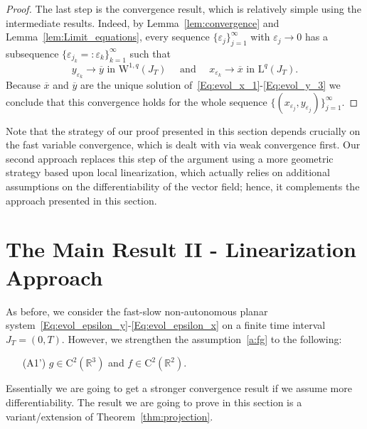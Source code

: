 \documentclass[12pt]{article}
\makeatletter
\newcommand{\mylabel}[2]{#2\def\@currentlabel{#2}\label{#1}}
\def\I{\infty}
\newcommand{\benn}{\begin{equation*}}
\newcommand{\eenn}{\end{equation*}}
\def\I{\infty}
\makeatother
\begin{document}
\begin{proof}
The last step is the convergence result, which is relatively simple using the intermediate
results. Indeed, by Lemma~\ref{lem:convergence} and Lemma~\ref{lem:Limit_equations}, 
every sequence $\{\varepsilon_j\}_{j=1}^\I$ with $\varepsilon_j \rightarrow 0$ has a 
subsequence $\{\varepsilon_{j_k}=:\varepsilon_k\}_{k=1}^\I$ such that  
\benn
y_{\varepsilon_k} \rightarrow \overline{y} \text{ in } \mathrm{W}^{1,q}(J_T)
	\quad \text{ and } \quad x_{\varepsilon_k} \rightarrow \overline{x} \text{ in } 
	\mathrm{L}^{q}(J_T).
\eenn
Because $\overline{x}$ and $\overline{y}$ are the unique solution 
of~\eqref{Eq:evol_x_1}-\eqref{Eq:evol_y_3} we conclude that this convergence holds 
for the whole sequence $\{(x_{\varepsilon_j},y_{\varepsilon_j})\}_{j=1}^\I$.	
\end{proof}

Note that the strategy of our proof presented in this section depends crucially 
on the fast variable convergence, which is dealt with via weak convergence first.
Our second approach replaces this step of the argument using a more geometric
strategy based upon local linearization, which actually relies on additional 
assumptions on the differentiability of the vector field; hence, it complements 
the approach presented in this section.

\section{The Main Result II - Linearization Approach}
\label{sec:main2}

As before, we consider the fast-slow non-autonomous planar 
system~\eqref{Eq:evol_epsilon_y}-\eqref{Eq:evol_epsilon_x} on a
finite time interval $J_T=(0,T)$. However, we strengthen
the assumption~\ref{a:fg} to the following: 

\begin{itemize}
		\item[\mylabel{a:fgnew}{(A1')}] $g\in \mathrm{C}^2(\mathbb{R}^3)$ and 
		$f\in \mathrm{C}^2(\mathbb{R}^2)$. 
\end{itemize}

Essentially we are going to get a stronger convergence result if we assume
more differentiability. The result we are going to prove in this section is 
a variant/extension of Theorem~\ref{thm:projection}.
\end{document}
